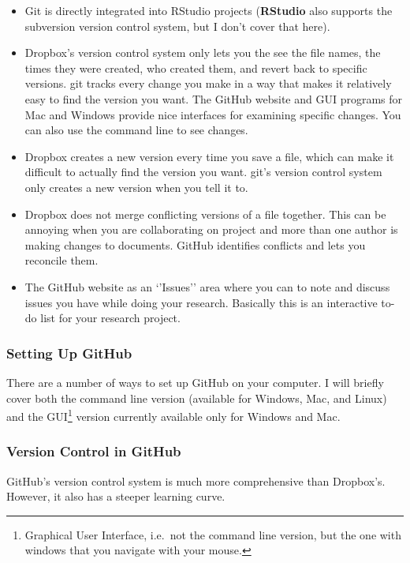 \documentclass[ChapterTOCs,krantz1]{krantz}\usepackage{graphicx, color}
\begin{document}
\begin{itemize}
\item
  Git is directly integrated into RStudio projects
  (\textbf{RStudio} also supports the subversion version
  control system, but I don't cover that here).
\item
  Dropbox's version control system only lets you the see the
  file names, the times they were created, who created them, and revert
  back to specific versions. git tracks every change you make
  in a way that makes it relatively easy to find the version you want.
  The GitHub website and GUI programs for Mac and Windows
  provide nice interfaces for examining specific changes. You can also
  use the command line to see changes.
\item
  Dropbox creates a new version every time you save a file,
  which can make it difficult to actually find the version you want.
  git's version control system only creates a new version when
  you tell it to.
\item
  Dropbox does not merge conflicting versions of a file
  together. This can be annoying when you are collaborating on project
  and more than one author is making changes to documents.
  GitHub identifies conflicts and lets you reconcile them.
\item
  The GitHub website as an `'Issues'' area where you can to
  note and discuss issues you have while doing your research. Basically
  this is an interactive to-do list for your research project.
\end{itemize}

\subsubsection{Setting Up GitHub}

There are a number of ways to set up GitHub on your computer. I
will briefly cover both the command line version (available for Windows,
Mac, and Linux) and the GUI\footnote{Graphical User Interface, i.e.~not
  the command line version, but the one with windows that you navigate
  with your mouse.} version currently available only for Windows and
Mac.

\subsubsection{Version Control in GitHub}

GitHub's version control system is much more comprehensive than Dropbox's. However, it also has a steeper learning curve.
\end{document}
